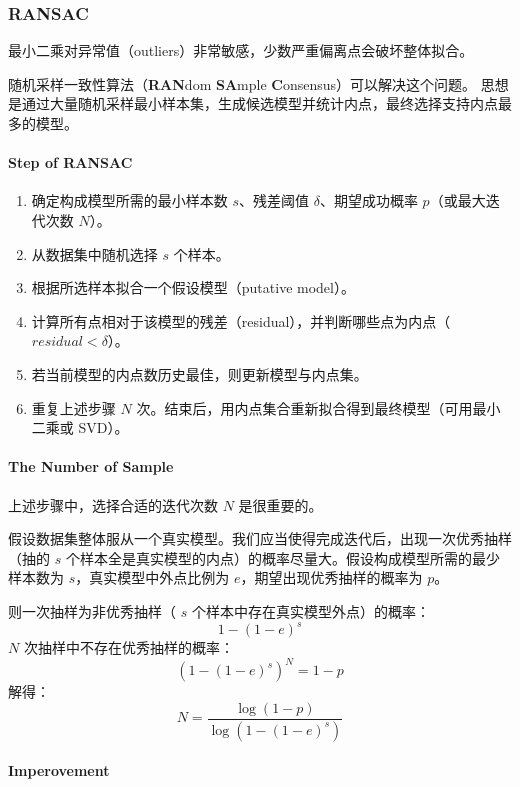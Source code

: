 \subsubsection{RANSAC}\label{ransac}

最小二乘对异常值（outliers）非常敏感，少数严重偏离点会破坏整体拟合。

随机采样一致性算法（\textbf{RAN}dom \textbf{SA}mple
\textbf{C}onsensus）可以解决这个问题。
思想是通过大量随机采样最小样本集，生成候选模型并统计内点，最终选择支持内点最多的模型。

\paragraph{Step of RANSAC}\label{step-of-ransac}

\begin{enumerate}
\def\labelenumi{\arabic{enumi}.}
\tightlist
\item
  确定构成模型所需的最小样本数 \(s\)、残差阈值 \(\delta\)、期望成功概率
  \(p\)（或最大迭代次数 \(N\)）。
\item
  从数据集中随机选择 \(s\) 个样本。
\item
  根据所选样本拟合一个假设模型（putative model）。
\item
  计算所有点相对于该模型的残差（residual），并判断哪些点为内点（\(residual < \delta\)）。
\item
  若当前模型的内点数历史最佳，则更新模型与内点集。
\item
  重复上述步骤 \(N\)
  次。结束后，用内点集合重新拟合得到最终模型（可用最小二乘或 SVD）。
\end{enumerate}

\paragraph{The Number of Sample}\label{the-number-of-sample}

上述步骤中，选择合适的迭代次数 \(N\) 是很重要的。

假设数据集整体服从一个真实模型。我们应当使得完成迭代后，出现一次优秀抽样（抽的
\(s\)
个样本全是真实模型的内点）的概率尽量大。假设构成模型所需的最少样本数为
\(s\)，真实模型中外点比例为 \(e\)，期望出现优秀抽样的概率为 \(p\)。

则一次抽样为非优秀抽样（ \(s\) 个样本中存在真实模型外点）的概率： \[
1 - (1 - e)^s
\] \(N\) 次抽样中不存在优秀抽样的概率： \[
(1 - (1 - e)^s)^N = 1 - p
\] 解得： \[
N = \frac{\log(1 - p)}{\log(1 - (1 - e)^s)}
\]

\paragraph{Imperovement}\label{imperovement}

